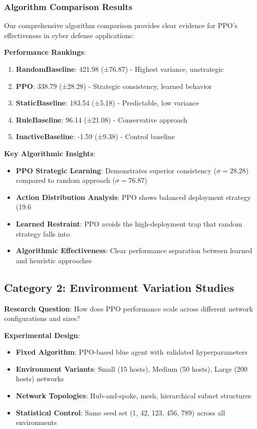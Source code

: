 \documentclass[12pt,twoside]{article}
\theoremstyle{definition}
\theoremstyle{plain}
\begin{document}
\subsubsection{Algorithm Comparison Results}

Our comprehensive algorithm comparison provides clear evidence for PPO's effectiveness in cyber defense applications:

\textbf{Performance Rankings}:
\begin{enumerate}
\item \textbf{RandomBaseline}: 421.98 (±76.87) - Highest variance, unstrategic
\item \textbf{PPO}: 338.79 (±28.28) - Strategic consistency, learned behavior  
\item \textbf{StaticBaseline}: 183.54 (±5.18) - Predictable, low variance
\item \textbf{RuleBaseline}: 96.14 (±21.08) - Conservative approach
\item \textbf{InactiveBaseline}: -1.59 (±9.38) - Control baseline
\end{enumerate}

\textbf{Key Algorithmic Insights}:
\begin{itemize}
\item \textbf{PPO Strategic Learning}: Demonstrates superior consistency ($\sigma=28.28$) compared to random approach ($\sigma=76.87$)
\item \textbf{Action Distribution Analysis}: PPO shows balanced deployment strategy (19.6%
\item \textbf{Learned Restraint}: PPO avoids the high-deployment trap that random strategy falls into
\item \textbf{Algorithmic Effectiveness}: Clear performance separation between learned and heuristic approaches
\end{itemize}

\subsection{Category 2: Environment Variation Studies}

\textbf{Research Question}: How does PPO performance scale across different network configurations and sizes?

\textbf{Experimental Design}:
\begin{itemize}
\item \textbf{Fixed Algorithm}: PPO-based blue agent with validated hyperparameters
\item \textbf{Environment Variants}: Small (15 hosts), Medium (50 hosts), Large (200 hosts) networks
\item \textbf{Network Topologies}: Hub-and-spoke, mesh, hierarchical subnet structures
\item \textbf{Statistical Control}: Same seed set (1, 42, 123, 456, 789) across all environments
\end{itemize}
\end{document}

